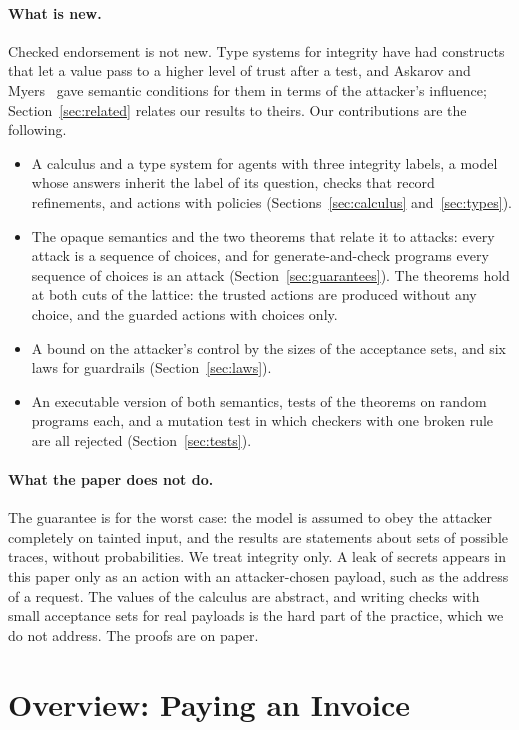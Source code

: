\documentclass[acmsmall,nonacm,screen]{acmart}
\begin{document}
\paragraph{What is new.} Checked endorsement is not new. Type systems for integrity have had
constructs that let a value pass to a higher level of trust after a test, and Askarov and
Myers~\cite{askarov2011} gave semantic conditions for them in terms of the attacker's
influence; Section~\ref{sec:related} relates our results to theirs. Our contributions are the
following.
\begin{itemize}
\item A calculus and a type system for agents with three integrity labels, a model whose
answers inherit the label of its question, checks that record refinements, and actions with
policies (Sections~\ref{sec:calculus} and~\ref{sec:types}).
\item The opaque semantics and the two theorems that relate it to attacks: every attack is a
sequence of choices, and for generate-and-check programs every sequence of choices is an
attack (Section~\ref{sec:guarantees}). The theorems hold at both cuts of the lattice: the
trusted actions are produced without any choice, and the guarded actions with choices only.
\item A bound on the attacker's control by the sizes of the acceptance sets, and six laws for
guardrails (Section~\ref{sec:laws}).
\item An executable version of both semantics, tests of the theorems on \exPrograms{} random
programs each, and a mutation test in which \exRules{} checkers with one broken rule are all
rejected (Section~\ref{sec:tests}).
\end{itemize}

\paragraph{What the paper does not do.} The guarantee is for the worst case: the model is
assumed to obey the attacker completely on tainted input, and the results are statements
about sets of possible traces, without probabilities. We treat integrity only. A leak of
secrets appears in this paper only as an action with an attacker-chosen payload, such as the
address of a request. The values of the calculus are abstract, and writing checks with small
acceptance sets for real payloads is the hard part of the practice, which we do not address.
The proofs are on paper.

\section{Overview: Paying an Invoice}
\label{sec:overview}
\end{document}
